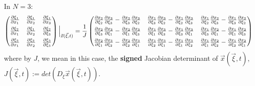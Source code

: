 \documentclass[11pt, a4paper]{article} %
\begin{document}
In $N=3$:
\begin{equation}
\begin{pmatrix}
\pdv{\xi_1}{x_1} & \pdv{\xi_1}{x_2} & \pdv{\xi_1}{x_3} \vspace{0.15cm}\\
\pdv{\xi_2}{x_1} & \pdv{\xi_1}{x_2} & \pdv{\xi_2}{\xi_3}\vspace{0.15cm}\\
\pdv{\xi_3}{x_1} & \pdv{\xi_3}{x_2} & \pdv{\xi_3}{\xi_3}
\end{pmatrix}\Big\rvert_{\vec{x}(\vec{\xi},t)}= \frac{1}{J} \begin{pmatrix}
\pdv{x_2}{\xi_2}\pdv{x_3}{\xi_3}-\pdv{x_2}{\xi_3}\pdv{x_3}{\xi_2} & \pdv{x_1}{\xi_3}\pdv{x_3}{\xi_2}- \pdv{x_1}{\xi_2}\pdv{x_3}{\xi_3} & \pdv{x_1}{\xi_2}\pdv{x_2}{\xi_3}-\pdv{x_1}{\xi_3}\pdv{x_2}{\xi_2} \vspace{0.15cm}\\

\pdv{x_2}{\xi_3}\pdv{x_3}{\xi_1}-\pdv{x_2}{\xi_1}\pdv{x_3}{\xi_3} & \pdv{x_1}{\xi_1}\pdv{x_3}{\xi_3}- \pdv{x_1}{\xi_3}\pdv{x_3}{\xi_1} & \pdv{x_1}{\xi_3}\pdv{x_2}{\xi_1}-\pdv{x_1}{\xi_1}\pdv{x_2}{\xi_3} \vspace{0.15cm}\\

\pdv{x_2}{\xi_1}\pdv{x_3}{\xi_2}-\pdv{x_2}{\xi_2}\pdv{x_3}{\xi_1} & \pdv{x_1}{\xi_2}\pdv{x_3}{\xi_1}- \pdv{x_1}{\xi_1}\pdv{x_3}{\xi_2} & \pdv{x_1}{\xi_1}\pdv{x_2}{\xi_2}-\pdv{x_1}{\xi_2}\pdv{x_2}{\xi_1} \\

\end{pmatrix}
\end{equation}
where by $J$, we mean in this case, the {\bf signed} Jacobian determinant of $\vec{x}(\vec{\xi},t)$,  $J(\vec{\xi},t):=det(D_\xi\vec{x}(\vec{\xi},t))$.
\end{document}
